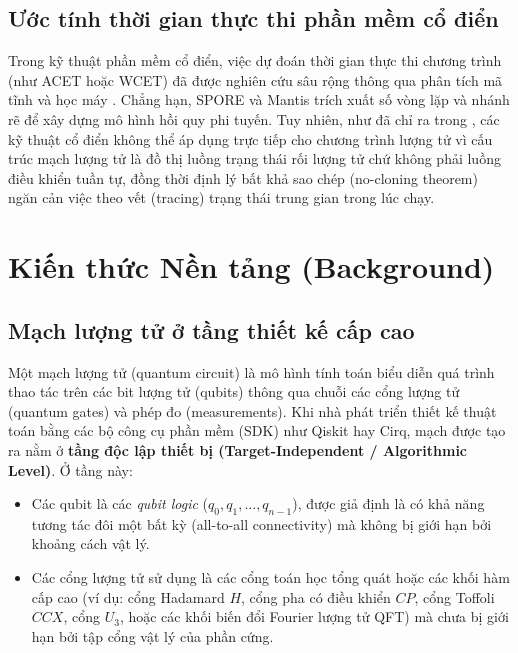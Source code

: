 \documentclass[11pt, a4paper]{article}
\begin{document}
\subsection{Ước tính thời gian thực thi phần mềm cổ điển}
Trong kỹ thuật phần mềm cổ điển, việc dự đoán thời gian thực thi chương trình (như ACET hoặc WCET) đã được nghiên cứu sâu rộng thông qua phân tích mã tĩnh và học máy \cite{huang2010predicting, kwon2014mantis, meng2016nonlinear, bielecki2023estimation}. Chẳng hạn, SPORE \cite{huang2010predicting} và Mantis \cite{kwon2014mantis} trích xuất số vòng lặp và nhánh rẽ để xây dựng mô hình hồi quy phi tuyến. Tuy nhiên, như đã chỉ ra trong \cite{ma2025understanding}, các kỹ thuật cổ điển không thể áp dụng trực tiếp cho chương trình lượng tử vì cấu trúc mạch lượng tử là đồ thị luồng trạng thái rối lượng tử chứ không phải luồng điều khiển tuần tự, đồng thời định lý bất khả sao chép (no-cloning theorem) \cite{wootters1982single} ngăn cản việc theo vết (tracing) trạng thái trung gian trong lúc chạy.

\section{Kiến thức Nền tảng (Background)}

\subsection{Mạch lượng tử ở tầng thiết kế cấp cao}
Một mạch lượng tử (quantum circuit) là mô hình tính toán biểu diễn quá trình thao tác trên các bit lượng tử (qubits) thông qua chuỗi các cổng lượng tử (quantum gates) và phép đo (measurements). Khi nhà phát triển thiết kế thuật toán bằng các bộ công cụ phần mềm (SDK) như Qiskit \cite{javadi2024qiskit} hay Cirq, mạch được tạo ra nằm ở \textbf{tầng độc lập thiết bị (Target-Independent / Algorithmic Level)}. Ở tầng này:
\begin{itemize}
    \item Các qubit là các \textit{qubit logic} ($q_0, q_1, \dots, q_{n-1}$), được giả định là có khả năng tương tác đôi một bất kỳ (all-to-all connectivity) mà không bị giới hạn bởi khoảng cách vật lý.
    \item Các cổng lượng tử sử dụng là các cổng toán học tổng quát hoặc các khối hàm cấp cao (ví dụ: cổng Hadamard $H$, cổng pha có điều khiển $CP$, cổng Toffoli $CCX$, cổng $U_3$, hoặc các khối biến đổi Fourier lượng tử QFT) mà chưa bị giới hạn bởi tập cổng vật lý của phần cứng.
\end{itemize}
\end{document}
